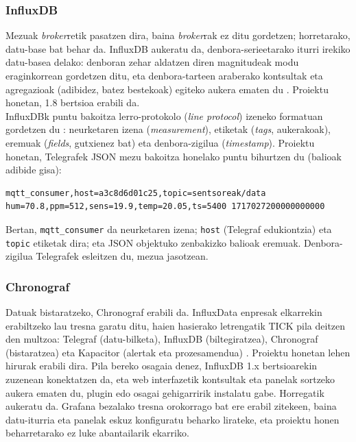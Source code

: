 \documentclass[10pt]{article}
\begin{document}
\subsubsection{InfluxDB}
\label{sec:influx}

Mezuak \textit{broker}retik pasatzen dira, baina \textit{broker}rak ez ditu gordetzen; horretarako, datu-base bat behar da. InfluxDB aukeratu da, denbora-serieetarako iturri irekiko datu-basea delako: denboran zehar aldatzen diren magnitudeak modu eraginkorrean gordetzen ditu, eta denbora-tarteen araberako kontsultak eta agregazioak (adibidez, batez bestekoak) egiteko aukera ematen du \cite{naqvi2017time}. Proiektu honetan, 1.8 bertsioa erabili da.\\

InfluxDBk puntu bakoitza lerro-protokolo (\textit{line protocol}) izeneko formatuan gordetzen du \cite{calabuig2022desarrollo}: neurketaren izena (\textit{measurement}), etiketak (\textit{tags}, aukerakoak), eremuak (\textit{fields}, gutxienez bat) eta denbora-zigilua (\textit{timestamp}). Proiektu honetan, Telegrafek \ac{JSON} mezu bakoitza honelako puntu bihurtzen du (balioak adibide gisa):

\begin{lstlisting}[style=terminal]
mqtt_consumer,host=a3c8d6d01c25,topic=sentsoreak/data hum=70.8,ppm=512,sens=19.9,temp=20.05,ts=5400 1717027200000000000
\end{lstlisting}

Bertan, \texttt{mqtt\_consumer} da neurketaren izena; \texttt{host} (Telegraf edukiontzia) eta \texttt{topic} etiketak dira; eta \ac{JSON} objektuko zenbakizko balioak eremuak. Denbora-zigilua Telegrafek esleitzen du, mezua jasotzean.\\

\subsubsection{Chronograf}

Datuak bistaratzeko, Chronograf erabili da. InfluxData enpresak elkarrekin erabiltzeko lau tresna garatu ditu, haien hasierako letrengatik TICK pila deitzen den multzoa: Telegraf (datu-bilketa), InfluxDB (biltegiratzea), Chronograf (bistaratzea) eta Kapacitor (alertak eta prozesamendua) \cite{influxdata_chronograf}. Proiektu honetan lehen hirurak erabili dira. Pila bereko osagaia denez, InfluxDB 1.x bertsioarekin zuzenean konektatzen da, eta web interfazetik kontsultak eta panelak sortzeko aukera ematen du, plugin edo osagai gehigarririk instalatu gabe. Horregatik aukeratu da. Grafana bezalako tresna orokorrago bat ere erabil zitekeen, baina datu-iturria eta panelak eskuz konfiguratu beharko lirateke, eta proiektu honen beharretarako ez luke abantailarik ekarriko.\\
\end{document}
